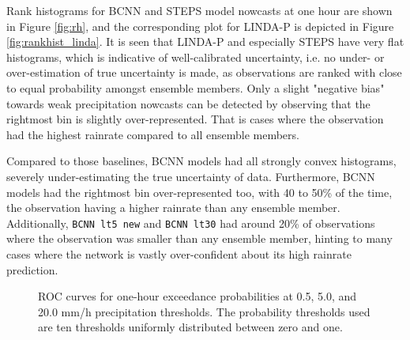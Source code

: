 Rank histograms for BCNN and STEPS model nowcasts at one hour are shown in Figure \ref{fig:rh}, and the corresponding plot for LINDA-P is depicted in Figure \ref{fig:rankhist_linda}. It is seen that LINDA-P and especially STEPS have very flat histograms, which is indicative of well-calibrated uncertainty, i.e. no under- or over-estimation of true uncertainty is made, as observations are ranked with close to equal probability amongst ensemble members. Only a slight "negative bias" towards weak precipitation nowcasts can be detected by observing that the rightmost bin is slightly over-represented. That is cases where the observation had the highest rainrate compared to all ensemble members. 

Compared to those baselines, BCNN models had all strongly convex histograms, severely under-estimating the true uncertainty of data. Furthermore, BCNN models had the rightmost bin over-represented too, with 40 to 50\% of the time, the observation having a higher rainrate than any ensemble member. Additionally, \texttt{BCNN lt5 new} and \texttt{BCNN lt30} had around 20\% of observations where the observation was smaller than any ensemble member, hinting to many cases where the network is vastly over-confident about its high rainrate prediction. 

\begin{figure}[H]
	
	\caption{ROC curves for one-hour exceedance probabilities at 0.5, 5.0, and 20.0 mm/h precipitation thresholds. The probability thresholds used are ten thresholds uniformly distributed between zero and one.}
	\label{fig:roc}
\end{figure}

